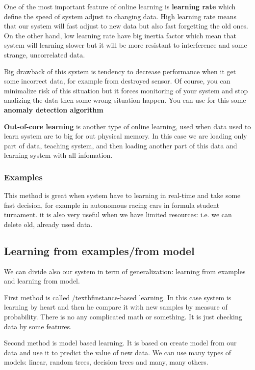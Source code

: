 \documentclass{article}
\begin{document}
  One of the most important feature of online learning is \textbf{learning rate} which define the speed of system adjust to changing data. High learning rate means that our system will fast adjust to new data but also fast forgetting the old ones. On the other hand, low learning rate have big inertia factor which mean that system will learning slower but it will be more resistant to interference and some strange, uncorrelated data.

  Big drawback of this system is tendency to decrease performance when it get some incorrect data, for example from destroyed sensor. Of course, you can minimalize risk of this situation but it forces monitoring of your system and stop analizing the data then some wrong situation happen. You can use for this some \textbf{anomaly detection algorithm}

  \textbf{Out-of-core learning} is another type of online learning, used when data used to learn system are to big for out physical memory. In this case we are loading only part of data, teaching system, and then loading another part of this data and learning system with all infomation.


    \subsubsection{Examples}
    This method is great when system have to learning in real-time and take some fast decision, for example in autonomous racing cars in formula student turnament. it is also very useful when we have limited resources: i.e. we can delete old, already used data.
  \newpage

  \subsection{Learning from examples/from model}
  We can divide also our system in term of generalization: learning from examples and learning from model.

  First method is called /textbf{instance-based learning}. In this case system is learning by heart and then he compare it with new samples by measure of probability. There is no any complicated math or something. It is just checking data by some features.

  Second method is model based learning. It is based on create model from our data and use it to predict the value of new data. We can use many types of models: linear, random trees, decision trees and many, many others.
  
\end{document}
